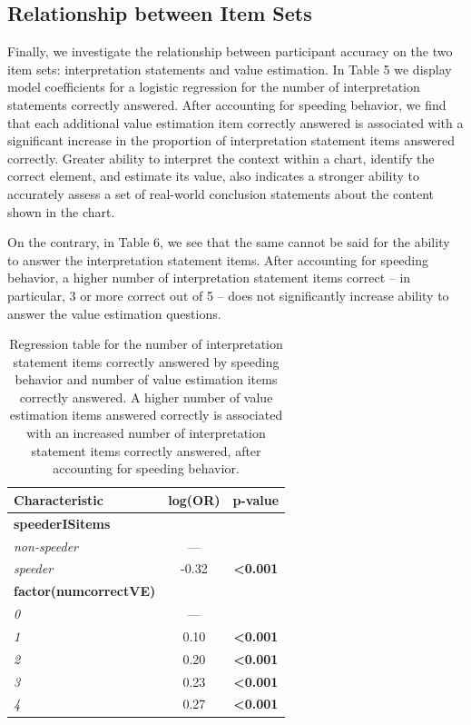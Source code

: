 \documentclass{IEEEcsmag}
\begin{document}
\subsection{Relationship between Item Sets}\label{relationship-between-item-sets}

Finally, we investigate the relationship between participant accuracy on the two item sets: interpretation statements and value estimation. In Table 5 we display model coefficients for a logistic regression for the number of interpretation statements correctly answered. After accounting for speeding behavior, we find that each additional value estimation item correctly answered is associated with a significant increase in the proportion of interpretation statement items answered correctly. Greater ability to interpret the context within a chart, identify the correct element, and estimate its value, also indicates a stronger ability to accurately assess a set of real-world conclusion statements about the content shown in the chart.

On the contrary, in Table 6, we see that the same cannot be said for the ability to answer the interpretation statement items. After accounting for speeding behavior, a higher number of interpretation statement items correct -- in particular, 3 or more correct out of 5 -- does not significantly increase ability to answer the value estimation questions.

\begin{table}

\caption{Regression table for the number of interpretation statement items correctly answered by speeding behavior and number of value estimation items correctly answered. A higher number of value estimation items answered correctly is associated with an increased number of interpretation statement items correctly answered, after accounting for speeding behavior. }


\begin{tabular}{lcc}
\toprule
\textbf{Characteristic} & \textbf{log(OR)} & \textbf{p-value}\\
\midrule
\textbf{speederISitems} &  & \\
\textit{non-speeder} & — & \\
\textit{speeder} & -0.32 & \textbf{<0.001}\\
\textbf{factor(numcorrectVE)} &  & \\
\textit{0} & — & \\\textit{1} & 0.10 & \textbf{<0.001}\\
\textit{2} & 0.20 & \textbf{<0.001}\\
\textit{3} & 0.23 & \textbf{<0.001}\\
\textit{4} & 0.27 & \textbf{<0.001}\\
\bottomrule
\end{tabular}


\end{table}
\end{document}
